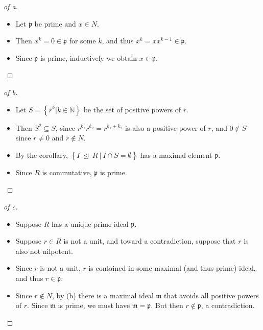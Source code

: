 \begin{solution}

\envlist

\begin{proof}[of a]

\envlist

\begin{itemize}
\tightlist
\item
  Let \(\mathfrak{p}\) be prime and \(x\in N\).
\item
  Then \(x^k = 0 \in \mathfrak{p}\) for some \(k\), and thus
  \(x^k = x x^{k-1} \in \mathfrak p\).
\item
  Since \(\mathfrak p\) is prime, inductively we obtain
  \(x\in\mathfrak p\).
\end{itemize}

\end{proof}

\begin{proof}[of b]

\envlist

\begin{itemize}
\item
  Let \(S = \left\{{r^k \mathrel{\Big|}k\in {\mathbb{N}}}\right\}\) be
  the set of positive powers of \(r\).
\item
  Then \(S^2 \subseteq S\), since \(r^{k_1}r^{k_2} = r^{k_1+k_2}\) is
  also a positive power of \(r\), and \(0\not\in S\) since \(r\neq 0\)
  and \(r\not\in N\).
\item
  By the corollary,
  \(\left\{{I {~\trianglelefteq~}R {~\mathrel{\Big|}~}I\cap S = \emptyset}\right\}\)
  has a maximal element \(\mathfrak{p}\).
\item
  Since \(R\) is commutative, \(\mathfrak{p}\) is prime.
\end{itemize}

\end{proof}

\begin{proof}[of c]

\envlist

\begin{itemize}
\item
  Suppose \(R\) has a unique prime ideal \(\mathfrak{p}\).
\item
  Suppose \(r\in R\) is not a unit, and toward a contradiction, suppose
  that \(r\) is also not nilpotent.
\item
  Since \(r\) is not a unit, \(r\) is contained in some maximal (and
  thus prime) ideal, and thus \(r \in \mathfrak{p}\).
\item
  Since \(r\not\in N\), by (b) there is a maximal ideal \(\mathfrak{m}\)
  that avoids all positive powers of \(r\). Since \(\mathfrak{m}\) is
  prime, we must have \(\mathfrak{m} = \mathfrak{p}\). But then
  \(r\not\in \mathfrak{p}\), a contradiction.
\end{itemize}

\end{proof}

\end{solution}

